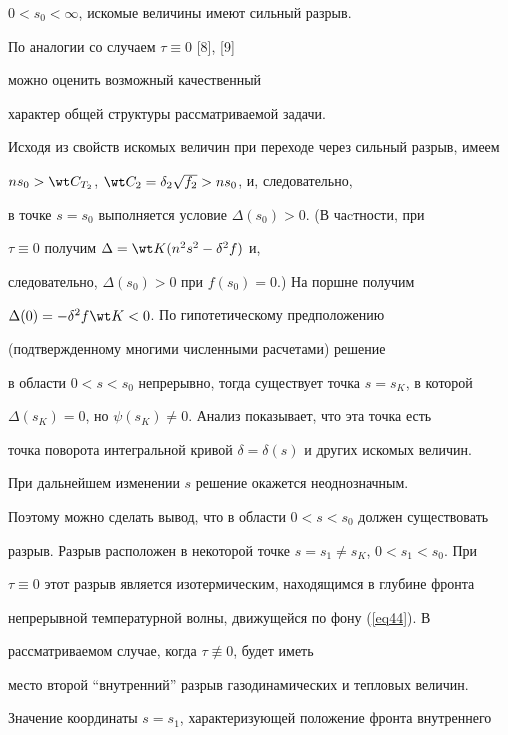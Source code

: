 $0<s_0<\infty$, искомые величины имеют сильный разрыв.





По аналогии со случаем $\tau\equiv0$ [8], [9]


можно оценить возможный качественный


характер общей структуры рассматриваемой задачи.





Исходя из свойств искомых величин при переходе через сильный разрыв, имеем


$ns_0>\wt C_{T_2}$, $\wt C_2=\delta_2\sqrt{f_2}>ns_0$, и, следовательно,


в точке $s=s_0$ выполняется условие $\Delta(s_0)>0$. (В чаcтности, при


$\tau\equiv0$ получим $\Delta=\wt K(n^2s^2-\delta^2f)$ и,


следовательно, $\Delta(s_0)>0$ при $f(s_0)=0$.) На поршне получим


$\Delta(0)=-\delta^2f\wt K<0$. По гипотетическому предположению


(подтвержденному многими численными расчетами) решение


в области $0<s<s_0$ непрерывно, тогда существует точка $s=s_K$, в которой


$\Delta(s_K)=0$, но $\psi(s_K)\ne0$. Анализ показывает, что эта точка есть


точка поворота интегральной кривой $\delta=\delta(s)$ и других искомых величин.


При дальнейшем изменении $s$ решение окажется неоднозначным.





Поэтому можно сделать вывод, что в области $0<s<s_0$ должен существовать


разрыв. Разрыв расположен в некоторой точке $s=s_1\ne s_K$, $0<s_1<s_0$. При


$\tau\equiv0$ этот разрыв является изотермическим, находящимся в глубине фронта


непрерывной температурной волны, движущейся по фону (\ref{eq44}). В


рассматриваемом случае, когда $\tau\not\equiv0$, будет иметь


место второй ``внутренний'' разрыв газодинамических и тепловых величин.


Значение координаты $s=s_1$, характеризующей положение фронта внутреннего


